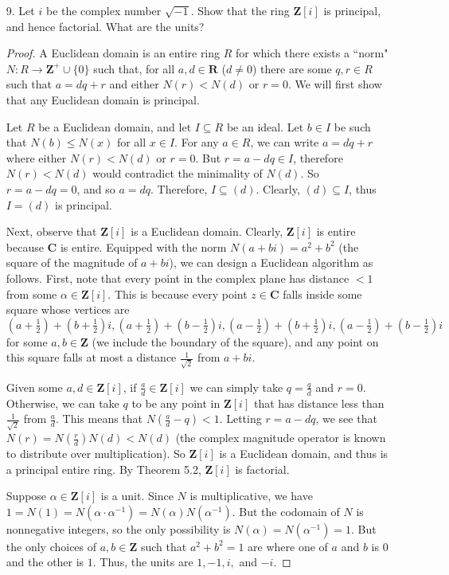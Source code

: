\documentclass[10pt]{article}
\newcommand{\Z}{\mathbf{Z}}
\newcommand{\R}{\mathbf{R}}
\newcommand{\C}{\mathbf{C}}
\begin{document}
\begin{enumerate}
\item[9.] Let $i$ be the complex number $\sqrt{-1}$.  Show that the ring $\Z[i]$ is principal, and hence factorial.  What are the units?

\begin{proof}
A Euclidean domain is an entire ring $R$ for which there exists a ``norm" $N: R \rightarrow \Z^+ \cup \{0\}$ such that, for all $a, d \in \R$ ($d \neq 0$) there are some $q, r \in R$ such that  $a = dq + r$ and either $N(r) < N(d)$ or $r = 0$.  We will first show that any Euclidean domain is principal.

Let $R$ be a Euclidean domain, and let $I \subseteq R$ be an ideal.  Let $b \in I$ be such that $N(b) \leq N(x)$ for all $x \in I$.  For any $a \in R$, we can write $a = dq + r$ where either $N(r) < N(d)$ or $r= 0$.  But $r = a - dq \in I$, therefore $N(r) < N(d)$ would contradict the minimality of $N(d)$.  So $r = a-dq = 0$, and so $a = dq$.  Therefore, $I \subseteq (d)$.  Clearly, $(d) \subseteq I$, thus $I = (d)$ is principal.

Next, observe that $\Z[i]$ is a Euclidean domain.  Clearly, $\Z[i]$ is entire because $\C$ is entire.  Equipped with the norm $N(a+bi) = a^2 + b^2$ (the square of the magnitude of $a+bi$), we can design a Euclidean algorithm as follows.  First, note that every point in the complex plane has distance $< 1$ from some $\alpha \in \Z[i]$.  This is because every point $z \in \C$ falls inside some square whose vertices are $(a+\frac12) + (b+\frac12)i, (a+\frac12) + (b-\frac12)i, (a-\frac12) + (b+\frac12)i, (a-\frac12) + (b-\frac12)i$ for some $a,b \in \Z$ (we include the boundary of the square), and any point on this square falls at most a distance $\frac{1}{\sqrt{2}}$ from $a+bi$.  

Given some $a,d \in \Z[i]$, if $\frac{a}{d} \in \Z[i]$ we can simply take $q = \frac{q}{d}$ and $r = 0$.  Otherwise, we can take $q$ to be any point in $\Z[i]$ that has distance less than $\frac{1}{\sqrt{2}}$ from $\frac{a}{d}$.  This means that $N(\frac{a}{d} - q) < 1$.  Letting $r = a - dq$, we see that $N(r) = N(\frac{r}{d})N(d) < N(d)$ (the complex magnitude operator is known to distribute over multiplication).  So $\Z[i]$ is a Euclidean domain, and thus is a principal entire ring.  By Theorem 5.2, $\Z[i]$ is factorial.

Suppose $\alpha \in \Z[i]$ is a unit.  Since $N$ is multiplicative, we have $1 = N(1) = N(\alpha \cdot \alpha^{-1}) = N(\alpha) N(\alpha^{-1})$.  But the codomain of $N$ is nonnegative integers, so the only possibility is $N(\alpha)=N(\alpha^{-1}) = 1$.  But the only choices of $a,b \in \Z$ such that $a^2 + b^2 = 1$ are where one of $a$ and $b$ is $0$ and the other is $1$.  Thus, the units are $1,-1,i,$ and $-i$.
\end{proof}


\end{enumerate}
\end{document}
